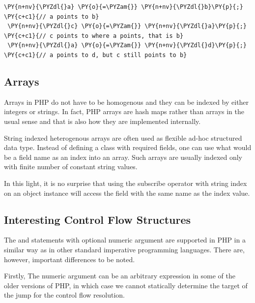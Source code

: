 \begin{Verbatim}[commandchars=\\\{\}]
 \PY{n+nv}{\PYZdl{}a} \PY{o}{=\PYZam{}} \PY{n+nv}{\PYZdl{}b}\PY{p}{;}       \PY{c+c1}{// a points to b}
 \PY{n+nv}{\PYZdl{}c} \PY{o}{=\PYZam{}} \PY{n+nv}{\PYZdl{}a}\PY{p}{;}       \PY{c+c1}{// c points to where a points, that is b}
 \PY{n+nv}{\PYZdl{}a} \PY{o}{=\PYZam{}} \PY{n+nv}{\PYZdl{}d}\PY{p}{;}       \PY{c+c1}{// a points to d, but c still points to b}
\end{Verbatim}

    \subsection{Arrays}
    Arrays in PHP do not have to be homogenous and 
    they can be indexed by either integers or strings.
    In fact, PHP arrays are hash maps rather than arrays 
    in the usual sense and that is also how they are 
    implemented internally. 
    
    String indexed heterogenous arrays are often used 
    as flexible ad-hoc structured data type. 
    Instead of defining a class 
    with required fields, one can use what would be a 
    field name as an index into an array. Such arrays 
    are usually indexed only with finite number of 
    constant string values. 
    
    In this light, it is no 
    surprise that using the subscribe operator 
    \code{[]} with string index on an object instance will 
    access the field with the same name as the index value.

    \subsection{Interesting Control Flow Structures}
    The  and  statements with 
    optional numeric argument are supported in PHP in a 
    similar way as in other standard imperative programming 
    languages. There are, however, important differences 
    to be noted.
    
    Firstly, The numeric argument can be an arbitrary 
    expression in some of the older versions of PHP, in which 
    case we cannot statically determine the target of 
    the jump for the control flow resolution.
    
